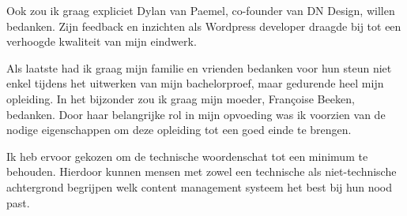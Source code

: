 Ook zou ik graag expliciet Dylan van Paemel, co-founder van DN Design, willen bedanken. Zijn feedback en inzichten als Wordpress developer draagde bij tot een verhoogde kwaliteit van mijn eindwerk.

Als laatste had ik graag mijn familie en vrienden bedanken voor hun steun niet enkel tijdens het uitwerken van mijn bachelorproef, maar gedurende heel mijn opleiding. In het bijzonder zou ik graag mijn moeder, Françoise Beeken, bedanken. Door haar belangrijke rol in mijn opvoeding was ik voorzien van de nodige eigenschappen om deze opleiding tot een goed einde te brengen.

Ik heb ervoor gekozen om de technische woordenschat tot een minimum te behouden. Hierdoor kunnen mensen met zowel een technische als niet-technische achtergrond begrijpen welk content management systeem het best bij hun nood past.
